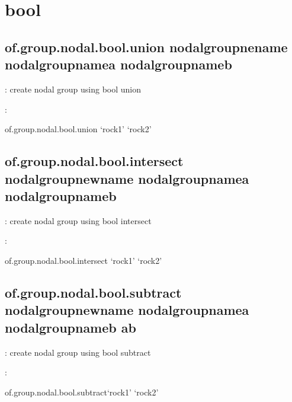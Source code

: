 \documentclass[letterpaper,10pt,english]{sphinxmanual}
\begin{document}
\section{bool}
\label{\detokenize{rst_tutorials/command_line_guide:bool}}

\subsection{of.group.nodal.bool.union nodalgroupnename nodalgroupnamea nodalgroupnameb}
\label{\detokenize{rst_tutorials/command_line_guide:of-group-nodal-bool-union-nodalgroupnename-nodalgroupnamea-nodalgroupnameb}}
: create nodal group using bool union

:

\begin{sphinxVerbatim}[commandchars=\\\{\}]
of.group.nodal.bool.union ‘rock1’ ‘rock2’
\end{sphinxVerbatim}


\subsection{of.group.nodal.bool.intersect nodalgroupnewname nodalgroupnamea nodalgroupnameb}
\label{\detokenize{rst_tutorials/command_line_guide:of-group-nodal-bool-intersect-nodalgroupnewname-nodalgroupnamea-nodalgroupnameb}}
: create nodal group using bool intersect

:

\begin{sphinxVerbatim}[commandchars=\\\{\}]
of.group.nodal.bool.intersect ‘rock1’ ‘rock2’
\end{sphinxVerbatim}


\subsection{of.group.nodal.bool.subtract nodalgroupnewname nodalgroupnamea nodalgroupnameb a\sphinxhyphen{}b}
\label{\detokenize{rst_tutorials/command_line_guide:of-group-nodal-bool-subtract-nodalgroupnewname-nodalgroupnamea-nodalgroupnameb-a-b}}
: create nodal group using bool subtract

:

\begin{sphinxVerbatim}[commandchars=\\\{\}]
of.group.nodal.bool.subtract‘rock1’ ‘rock2’
\end{sphinxVerbatim}
\end{document}
